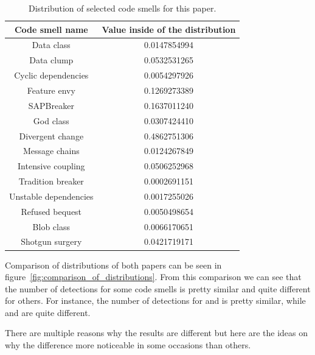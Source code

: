 \begin{table}
    \begin{center}
        \begin{tabular} {| c | c |}
            \hline
            \textbf{Code smell name} & \textbf{Value inside of the distribution} \\ \hline
            Data class & 0.0147854994 \\ \hline
            Data clump & 0.0532531265 \\ \hline
            Cyclic dependencies & 0.0054297926 \\ \hline
            Feature envy & 0.1269273389 \\ \hline
            SAPBreaker & 0.1637011240 \\ \hline
            God class & 0.0307424410 \\ \hline
            Divergent change & 0.4862751306 \\ \hline
            Message chains & 0.0124267849 \\ \hline
            Intensive coupling & 0.0506252968 \\ \hline
            Tradition breaker & 0.0002691151 \\ \hline
            Unstable dependencies & 0.0017255026 \\ \hline
            Refused bequest & 0.0050498654 \\ \hline
            Blob class & 0.0066170651 \\ \hline
            Shotgun surgery & 0.0421719171 \\ \hline
        \end{tabular}
        \caption{Distribution of selected code smells for this paper.}
        \label{tab:sonar_academic_plugin_values}
    \end{center}
\end{table}

Comparison of distributions of both papers can be seen in figure~\ref{fig:comparison_of_distributions}.
From this comparison we can see that the number of detections for some code smells is pretty similar and quite different for others.
For instance, the number of detections for  and  is pretty similar, while
 and  are quite different.

There are multiple reasons why the results are different but here are the ideas on why the difference more noticeable in
some occasions than others.

